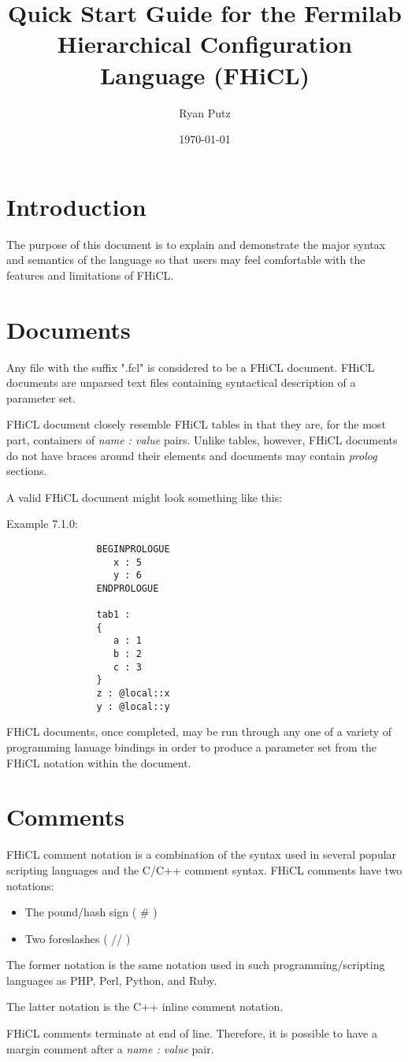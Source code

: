 \documentclass{memarticle}
\title{Quick Start Guide for the Fermilab Hierarchical Configuration Language (FHiCL)}
\date{\today}
\author{Ryan Putz}
\begin{document}
\setlength{\parindent}{0in}
\maketitle
\newpage
\tableofcontents
\newpage
\chapter{Introduction}
	The purpose of this document is to explain and demonstrate the major syntax and semantics
	of the language so that users may feel comfortable with the features
	and limitations of FHiCL.

\chapter{Documents}
        Any file with the suffix ".fcl" is considered to be a FHiCL document.
        FHiCL documents are unparsed text files containing syntactical description of a parameter set.
        \par
        FHiCL document closely resemble FHiCL tables in that they are, for the most part,
        containers of \emph{name : value} pairs.
        Unlike tables, however, FHiCL documents do not have braces around their elements
        and documents may contain \emph{prolog} sections.
        \par
        A valid FHiCL document might look something like this:
        \par
        Example 7.1.0:
        \begin{verbatim}
                BEGINPROLOGUE
                   x : 5
                   y : 6
                ENDPROLOGUE
                
                tab1 :
                {
                   a : 1
                   b : 2
                   c : 3
                }
                z : @local::x
                y : @local::y
        \end{verbatim}
        \par
        FHiCL documents, once completed, may be run through any one of a variety of programming lanuage bindings
        in order to produce a parameter set from the FHiCL notation within the document.

\chapter{Comments}
	FHiCL comment notation is a combination of the syntax used in several popular scripting languages and the C/C++ comment syntax.
	FHiCL comments have two notations:
	\begin{itemize}
		\item The pound/hash sign ( \# )
		\item Two foreslashes ( // )
	\end{itemize}
	\par
	The former notation is the same notation used in such programming/scripting languages as
	PHP, Perl, Python, and Ruby.
	\par
	The latter notation is the C++ inline comment notation.
	\par
	FHiCL comments terminate at end of line. 
	Therefore, it is possible to have a margin comment after a \emph{name : value} pair.
\end{document}

